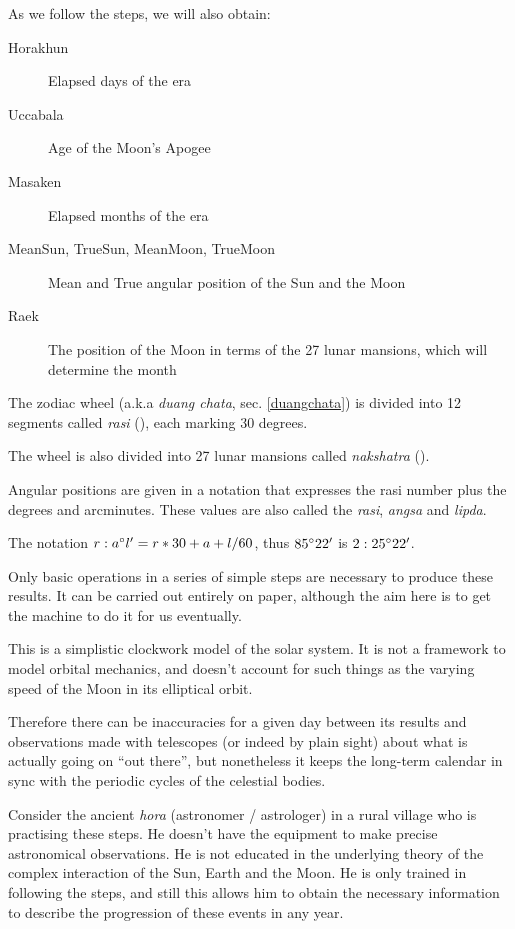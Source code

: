 \documentclass[11pt,oneside]{memoir-article}
\begin{document}
As we follow the steps, we will also obtain:

\begin{description}
\item[{Horakhun }] Elapsed days of the era
\item[{Uccabala }] Age of the Moon's Apogee
\item[{Masaken }] Elapsed months of the era

\item[{MeanSun, TrueSun, MeanMoon, TrueMoon}] Mean and True angular position of the Sun and the Moon
\item[{Raek}] The position of the Moon in terms of the 27 lunar mansions, which will determine the month
\end{description}

\spewnotes

The zodiac wheel (a.k.a \emph{duang chata}, sec. \ref{duangchata}) is divided into 12
segments called \emph{rasi} (), each marking 30 degrees.

The wheel is also divided into 27 lunar mansions called \emph{nakshatra}
().

Angular positions are given in a notation that expresses the rasi number plus
the degrees and arcminutes. These values are also called the \emph{rasi}, \emph{angsa} and
\emph{lipda}.

The notation $r:a^\circ l^\prime = r*30 + a + l/60$, thus $85^\circ 22^\prime$ is
$2:25^\circ 22^\prime$.


Only basic operations in a series of simple steps are necessary to produce these
results. It can be carried out entirely on paper, although the aim here is to
get the machine to do it for us eventually.

This is a simplistic clockwork model of the solar system. It is not a framework
to model orbital mechanics, and doesn't account for such things as the varying
speed of the Moon in its elliptical orbit.

Therefore there can be inaccuracies for a given day between its results and
observations made with telescopes (or indeed by plain sight) about what is
actually going on ``out there'', but nonetheless it keeps the long-term calendar
in sync with the periodic cycles of the celestial bodies.

Consider the ancient \emph{hora}  (astronomer / astrologer) in a rural village who is
practising these steps. He doesn't have the equipment to make precise
astronomical observations. He is not educated in the underlying theory of the
complex interaction of the Sun, Earth and the Moon. He is only trained in
following the steps, and still this allows him to obtain the necessary
information to describe the progression of these events in any year.
\end{document}

